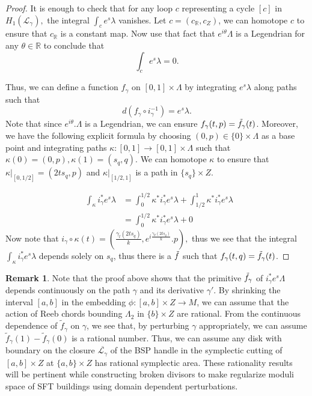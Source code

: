 \documentclass[11pt, oneside,dvipsnames]{amsart}
\renewcommand{\to}{\rightarrow}
\newcommand{\inv}{^{-1}}
\renewcommand{\to}{\rightarrow}
\newcommand{\<}{\langle}
\renewcommand{\>}{\rangle}
\newcommand{\bR}{\mathbb{R}}
\newcommand{\cL}{\mathcal{L}}
\renewcommand{\to}{\rightarrow}
\theoremstyle{definition}
\theoremstyle{definition}
\newtheorem{remark}[Theorem]{Remark}
\numberwithin{equation}{subsection}
\begin{document}
\begin{proof}
    It is enough to check that for any loop $c$ representing a cycle $[c]$ in $H_1(\cL_\gamma),$ the integral $\int_c e^s\lambda$ vanishes. Let $c = (c_\bR, c_Z)$, we can homotope $c$ to ensure that $c_\bR$ is a constant map. Now use that fact that $e^{i\theta} \Lambda$ is a Legendrian for any $\theta \in \bR$ to conclude that $$\int_c e^s\lambda = 0.$$

    \noindent Thus, we can define a function $f_\gamma$ on $[0,1]\times \Lambda$ by integrating $e^s\lambda$ along paths such that 
    $$ d (f_\gamma \circ i_\gamma\inv) = e^s\lambda.$$Note that since $e^{i\theta}.\Lambda$ is a Legendrian, we can ensure $f_\gamma(t,p)= \Tilde{f}_\gamma(t)$. Moreover, we have the following explicit formula by choosing $(0,p) \in \{ 0\} \times \Lambda$ as a base point and integrating paths $\kappa: [0,1] \to [0,1]\times \Lambda$ such that $\kappa(0)= (0,p) , \kappa(1)=(s_q,q)$. We can homotope $\kappa$ to ensure that $\kappa|_{[0,1/2]}=(2ts_q,p)$ and $\kappa|_{[1/2,1] }$ is a path in $\{s_q \} \times Z$.  

    \begin{align}
    \;\;\int_\kappa i_\gamma^* e^s\lambda  &= \int_0^{1/2} \kappa^*  i_\gamma^* e^s \lambda + \int_{1/2}^1 \kappa^* 
  i_\gamma^* e^s \lambda\\
    &=\int_0^{1/2} \kappa^*   i_\gamma^* e^s \lambda + 0
    \end{align}
    Now note that $i_\gamma \circ \kappa (t) = \left (\frac{\gamma_l(2ts_q)}{k}, e^{i\frac{\gamma_\theta(2ts_q)}{k}}.p\right),$ thus we see that the integral $\int_\kappa i_\gamma^* e^s\lambda$ depends solely on $s_q$, thus there is a $\Tilde{f}$ such that $f_\gamma(t,q)=\Tilde{f}_\gamma(t)$.
\end{proof}

\begin{remark}\label{rem:ctnyingamma}
    Note that the proof above shows that the primitive $\Tilde{f}_\gamma$ of  $i_\gamma^* e^s\Lambda$  depends continuously on the path $\gamma$ and its derivative $\gamma'$.  By shrinking the interval $[a,b]$ in the embedding $\phi : [a,b] \times Z \to M$, we can assume that the action of Reeb chords bounding $\Lambda_2$ in $\{ b\}\times Z$ are rational. From the continuous dependence of $\widetilde{f}_\gamma$ on $\gamma$, we see that, by perturbing $\gamma$ appropriately, we can assume $\widetilde{f}_\gamma (1) - \widetilde{f}_\gamma (0) $ is a rational number. Thus, we can assume any disk with boundary on the closure  $ \overline{\cL_\gamma}$ of the BSP handle in the symplectic cutting of $[a,b]\times Z$ at $\{a,b\}\times Z$ has rational symplectic area. These rationality results will be pertinent while constructing broken divisors to make regularize  moduli space of SFT buildings using domain dependent perturbations.
\end{remark}
\end{document}
